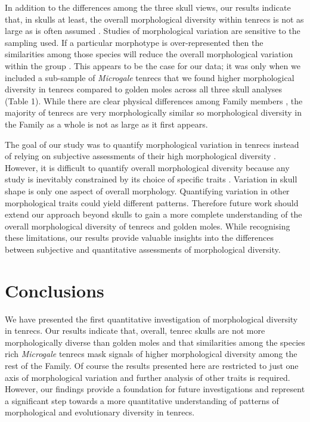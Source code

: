 \documentclass[12pt,a4paper]{article}
\begin{document}
	In addition to the differences among the three skull views, our results indicate that, in skulls at least, the overall morphological diversity within tenrecs is not as large as is often assumed \citep[e.g.][]{Eisenberg1969, Olson2013}. Studies of morphological variation are sensitive to the sampling used. If a particular morphotype is over-represented then the similarities among those species will reduce the overall morphological variation within the group \citep{Foote1991}. This appears to be the case for our data; it was only when we included a sub-sample of \textit{Microgale} tenrecs that we found higher morphological diversity in tenrecs compared to golden moles across all three skull analyses (Table 1).
	While there are clear physical differences among Family members \citep{Olson2013, Eisenberg1969}, the majority of tenrecs are very morphologically similar \citep{Jenkins2003} so morphological diversity in the Family as a whole is not as large as it first appears.  
	
	The goal of our study was to quantify morphological variation in tenrecs instead of relying on subjective assessments of their high morphological diversity \citep{Olson2013, Soarimalala2011, Eisenberg1969}. However, it is difficult to quantify overall morphological diversity because any study is inevitably constrained by its choice of specific traits \citep{Roy1997}. Variation in skull shape is only one aspect of overall morphology. Quantifying variation in other morphological traits could yield different patterns. Therefore future work should extend our approach beyond skulls to gain a more complete understanding of the overall morphological diversity of tenrecs and golden moles.
	While recognising these limitations, our results provide valuable insights into the differences between subjective and quantitative assessments of morphological diversity. 

\section{Conclusions}
	We have presented the first quantitative investigation of morphological diversity in tenrecs. Our results indicate that, overall, tenrec skulls are not more morphologically diverse than golden moles and that similarities among the species rich \textit{Microgale} tenrecs mask signals of higher morphological diversity among the rest of the Family. Of course the results presented here are restricted to just one axis of morphological variation and further analysis of other traits is required. However, our findings provide a foundation for future investigations and represent a significant step towards a more quantitative understanding of patterns of morphological and evolutionary diversity in tenrecs. 
\end{document}
